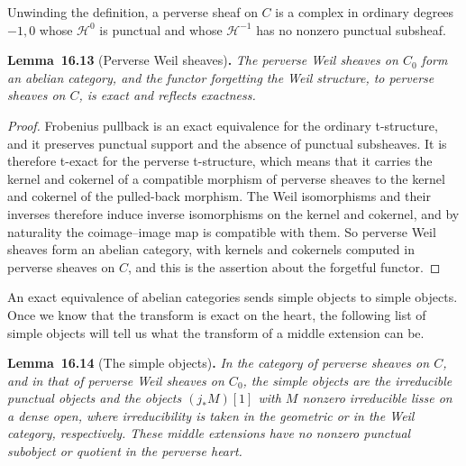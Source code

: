 \documentclass[11pt]{article}
\newenvironment{bpstatement}[2]{\par\addvspace{0.6\baselineskip}\noindent\textbf{#1}#2\textbf{.}\enspace\ignorespaces}
  {\par\addvspace{0.4\baselineskip}}
\newenvironment{bpstatementit}[2]{\begin{bpstatement}{#1}{#2}\itshape\ignorespaces}{\end{bpstatement}}
\begin{document}
\label{bp205}%
Unwinding the definition, a perverse sheaf on \(C\) is a complex in ordinary degrees \(-1,0\) whose \(\mathcal H^0\) is punctual and whose \(\mathcal H^{-1}\) has no nonzero punctual subsheaf.

\label{bp206}%
\begin{bpstatementit}{Lemma~16.13}{ (Perverse Weil sheaves)}
The perverse Weil sheaves on \(C_0\) form an abelian category, and the functor forgetting the Weil structure, to perverse sheaves on \(C\), is exact and reflects exactness.
\end{bpstatementit}

\begin{proof}[{Proof}]\label{bp207}%
Frobenius pullback is an exact equivalence for the ordinary t-structure, and it preserves punctual support and the absence of punctual subsheaves. It is therefore t-exact for the perverse t-structure, which means that it carries the kernel and cokernel of a compatible morphism of perverse sheaves to the kernel and cokernel of the pulled-back morphism. The Weil isomorphisms and their inverses therefore induce inverse isomorphisms on the kernel and cokernel, and by naturality the coimage–image map is compatible with them. So perverse Weil sheaves form an abelian category, with kernels and cokernels computed in perverse sheaves on \(C\), and this is the assertion about the forgetful functor.
\end{proof}

\label{bp208}%
An exact equivalence of abelian categories sends simple objects to simple objects. Once we know that the transform is exact on the heart, the following list of simple objects will tell us what the transform of a middle extension can be.

\label{bp209}%
\begin{bpstatementit}{Lemma~16.14}{ (The simple objects)}
In the category of perverse sheaves on \(C\), and in that of perverse Weil sheaves on \(C_0\), the simple objects are the irreducible punctual objects and the objects \((j_*M)[1]\) with \(M\) nonzero irreducible lisse on a dense open, where irreducibility is taken in the geometric or in the Weil category, respectively. These middle extensions have no nonzero punctual subobject or quotient in the perverse heart.
\end{bpstatementit}
\end{document}
